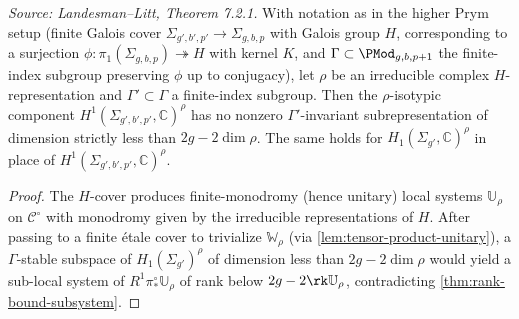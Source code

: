 
\begin{theorem}
  \label{thm:putman-wieland-asymptotic}
  \textit{Source: Landesman--Litt, Theorem 7.2.1.}
  With notation as in the higher Prym setup
  (finite Galois cover $\Sigma_{g',b',p'} \to \Sigma_{g,b,p}$ with Galois group
  $H$, corresponding to a surjection
  $\phi\colon \pi_1(\Sigma_{g,b,p}) \twoheadrightarrow H$ with kernel $K$, and
  $\Gamma \subset \PMod_{g,b,p+1}$ the finite-index subgroup preserving $\phi$
  up to conjugacy), let $\rho$ be an irreducible complex $H$-representation and
  $\Gamma' \subset \Gamma$ a finite-index subgroup.
  Then the $\rho$-isotypic component $H^1(\Sigma_{g',b',p'}, \mathbb{C})^\rho$
  has no nonzero $\Gamma'$-invariant subrepresentation of dimension strictly
  less than $2g - 2\dim\rho$.
  The same holds for $H_1(\Sigma_{g'}, \mathbb{C})^\rho$ in place of
  $H^1(\Sigma_{g',b',p'}, \mathbb{C})^\rho$.
\end{theorem}

\begin{proof}
  The $H$-cover produces finite-monodromy (hence unitary) local systems
  $\mathbb{U}_\rho$ on $\mathcal{C}^\circ$ with monodromy given by the
  irreducible representations of $H$.
  After passing to a finite \'{e}tale cover to trivialize $\mathbb{W}_\rho$
  (via \cref{lem:tensor-product-unitary}), a $\Gamma$-stable subspace of
  $H_1(\Sigma_{g'})^\rho$ of dimension less than $2g - 2\dim\rho$ would yield
  a sub-local system of $R^1\pi^\circ_* \mathbb{U}_\rho$ of rank below
  $2g - 2\rk\mathbb{U}_\rho$, contradicting \cref{thm:rank-bound-subsystem}.
\end{proof}

